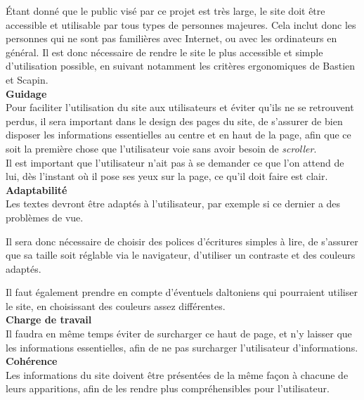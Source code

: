 \documentclass[a4paper,11pt]{article}
\begin{document}
Étant donné que le public visé par ce projet est très large, le site doit être accessible et utilisable par
tous types de personnes majeures. Cela inclut donc les personnes qui ne sont pas familières avec Internet, ou
avec les ordinateurs en général. Il est donc nécessaire de rendre le site le plus accessible et simple d'utilisation
possible, en suivant notamment les critères ergonomiques de Bastien et Scapin.\\

\textbf{Guidage}\\

Pour faciliter l'utilisation du site aux utilisateurs et éviter qu'ils ne se retrouvent perdus, il sera important dans le design des pages du site, de s'assurer de bien disposer les informations essentielles au centre et en haut de la page, afin que ce soit la première chose que l'utilisateur voie sans avoir besoin de \textit{scroller}.\\

Il est important que l'utilisateur n'ait pas à se demander ce que l'on attend de lui, dès l'instant où il pose ses yeux sur la page, ce qu'il doit faire est clair.\\

\textbf{Adaptabilité}\\

Les textes devront être adaptés à l’utilisateur, par exemple si ce dernier a des problèmes de vue.

Il sera donc nécessaire de choisir des polices d’écritures simples à lire, de s’assurer que sa taille soit
réglable via le navigateur, d’utiliser un contraste et des couleurs adaptés.

Il faut également prendre en compte d’éventuels daltoniens qui pourraient utiliser le site, en
choisissant des couleurs assez différentes.\\

\textbf{Charge de travail}\\

Il faudra en même temps éviter de surcharger ce haut de page, et n'y laisser que les informations essentielles, afin de ne pas surcharger l'utilisateur d'informations.\\

\textbf{Cohérence}\\

Les informations du site doivent être présentées de la même façon à chacune de leurs apparitions, afin de les rendre plus compréhensibles pour l'utilisateur.
\end{document}
